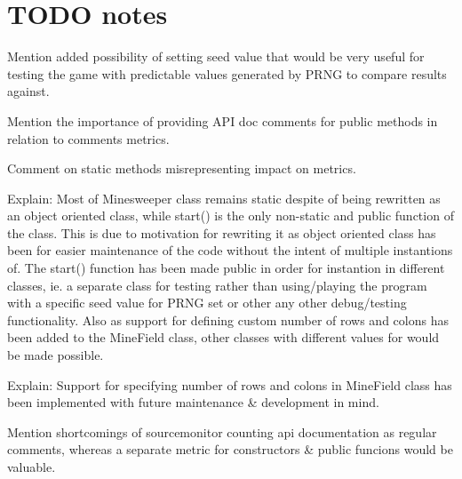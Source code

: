 \documentclass[UKenglish]{article}  %
\begin{document}
\section{TODO notes}
Mention added possibility of setting seed value that would be very useful for
testing the game with predictable values generated by PRNG to compare results
against.


Mention the importance of providing API doc comments for public methods in
relation to comments metrics.


Comment on static methods misrepresenting impact on metrics.

Explain: Most of Minesweeper class remains static despite of being rewritten
as an object oriented class, while start() is the only non-static and public
function of the class. This is due to motivation for rewriting it as object
oriented class has been for easier maintenance of the code without the intent
of multiple instantions of. The start() function has been made public in order
for instantion in different classes, ie. a separate class for testing rather
than using/playing the program with a specific seed value for PRNG set or
other any other debug/testing functionality.
Also as support for defining custom number of rows and colons has been added
to the MineField class, other classes with different values for would be
made possible.

Explain: Support for specifying number of rows and colons in MineField class
has been implemented with future maintenance \& development in mind.

Mention shortcomings of sourcemonitor counting api documentation as regular
comments, whereas a separate metric for constructors \& public funcions would
be valuable.
\end{document}
